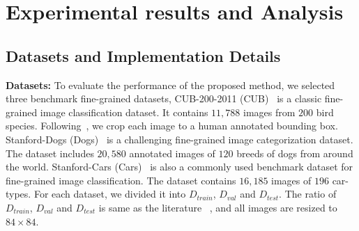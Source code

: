 \documentclass[letterpaper]{article} %
\begin{document}






\section{Experimental results and Analysis}




\subsection{Datasets and Implementation Details}\label{data_imp}
\textbf{Datasets:} 
To evaluate the performance of the proposed method, we selected {three} benchmark fine-grained datasets,
CUB-200-2011 (CUB)~\cite{WelinderEtal2010} is a classic fine-grained image classification dataset. It contains $11,788$ images from $200$ bird species. Following~\cite{Zhang_2020_CVPR,Ye_2020_CVPR}, we crop each image to a human annotated bounding box.
Stanford-Dogs (Dogs)~\cite{KhoslaYaoJayadevaprakashFeiFei_FGVC2011} is a challenging fine-grained image categorization dataset. The dataset includes $20,580$ annotated images of $120$ breeds of dogs from around the world.
Stanford-Cars (Cars)~\cite{6755945} is also a commonly used benchmark dataset for fine-grained image classification. The dataset contains $16,185$ images of $196$ car-types. 
For each dataset, we divided it into $D_{train}$, $D_{val}$ and $D_{test}$. The ratio of $D_{train}$, $D_{val}$ and $D_{test}$ is same as the literature ~\cite{zhu2020multi}, and all images are resized to $84 \times 84$. 
\end{document}

